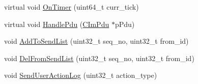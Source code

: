 \begin{DoxyCompactItemize}
\item 
virtual void \hyperlink{class_c_msg_conn_af11cb247ec91d7cbf388eb67a574c04d}{On\+Timer} (uint64\+\_\+t curr\+\_\+tick)
\item 
virtual void \hyperlink{class_c_msg_conn_a3837444039aae6506457575e3210f6ae}{Handle\+Pdu} (\hyperlink{class_c_im_pdu}{C\+Im\+Pdu} $\ast$p\+Pdu)
\item 
void \hyperlink{class_c_msg_conn_aac71c762d673a0e1d13f6f4a02d6c8e6}{Add\+To\+Send\+List} (uint32\+\_\+t seq\+\_\+no, uint32\+\_\+t from\+\_\+id)
\item 
void \hyperlink{class_c_msg_conn_a12973914a7c90f384462bc760b0a7155}{Del\+From\+Send\+List} (uint32\+\_\+t seq\+\_\+no, uint32\+\_\+t from\+\_\+id)
\item 
void \hyperlink{class_c_msg_conn_a2e7bc11d353f9d0baced0610d79e0c9a}{Send\+User\+Action\+Log} (uint32\+\_\+t action\+\_\+type)
\end{DoxyCompactItemize}
